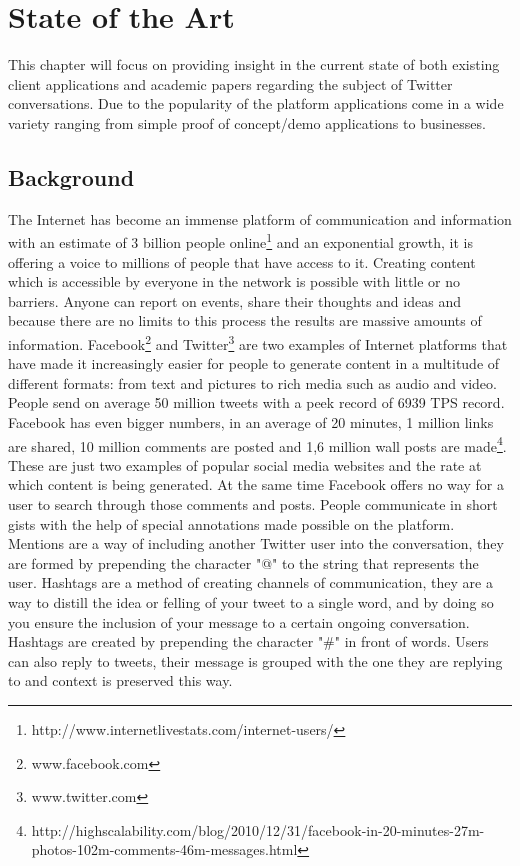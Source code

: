 \chapter{State of the Art}
\label{chapter:stateoftheart}

This chapter will focus on providing insight in the current state of both existing client applications and academic papers regarding the subject of Twitter conversations. Due to the popularity of the platform applications come in a wide variety ranging from simple proof of concept/demo applications to businesses.

\section{Background}
\label{sec:background}

The Internet has become an immense platform of communication and information with an estimate of 3 billion people online\footnote{http://www.internetlivestats.com/internet-users/} and an exponential growth, it is offering a voice to millions of people that have access to it.
Creating content which is accessible by everyone in the network is possible with little or no barriers. Anyone can report on events, share their thoughts and ideas and because there are no limits to this process the results are massive amounts of information.
\newline
Facebook\footnote{www.facebook.com} and Twitter\footnote{www.twitter.com} are two examples of Internet platforms that have made it increasingly easier for people to generate content in a multitude of different formats: from text and pictures to rich media such as audio and video.
\newline
People send on average 50 million tweets with a peek record of 6939 TPS record. Facebook has even bigger numbers, in an average of 20 minutes, 1 million links are shared, 10 million comments are posted and 1,6 million wall posts are made\footnote{http://highscalability.com/blog/2010/12/31/facebook-in-20-minutes-27m-photos-102m-comments-46m-messages.html}. These are just two examples of popular social media websites and the rate at which content is being generated.
\newline
At the same time Facebook offers no way for a user to search through those comments and posts. 
\newline
People communicate in short gists with the help of special annotations made possible on the platform. Mentions are a way of including another Twitter user into the conversation, they are formed by prepending the character "@" to the string that represents the user. Hashtags are a method of creating channels of communication, they are a way to distill the idea or felling of your tweet to a single word, and by doing so you ensure the inclusion of your message to a certain ongoing conversation. Hashtags are created by prepending the character "\#" in front of words. Users can also reply to tweets, their message is grouped with the one they are replying to and context is preserved this way.
